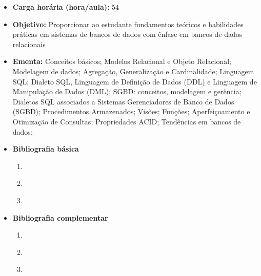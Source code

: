 \documentclass[11pt,fleqn]{book} %
\begin{document}
\begin{itemize}
	\item \textbf{Carga horária (hora/aula):} 54
	\item \textbf{Objetivo:} Proporcionar ao estudante fundamentos teóricos e habilidades práticas em sistemas de bancos de dados com ênfase em bancos de dados relacionais
	\item \textbf{Ementa:} 
	Conceitos básicos;
	Modelos Relacional e Objeto Relacional;
	Modelagem de dados; 
	Agregação, Generalização e Cardinalidade; 
	Linguagem SQL; 
	Dialeto SQL, Linguagem de Definição de Dados (DDL) e Linguagem de Manipulação de Dados (DML);
	SGBD: conceitos, modelagem e gerência;
	Dialetos SQL associados a Sistemas Gerenciadores de Banco de Dados (SGBD);
	Procedimentos Armazenados; 
	Visões; 
	Funções; 
	Aperfeiçoamento e Otimização de Consultas;
	Propriedades ACID;
	Tendências em bancos de dados;
	\item \textbf{Bibliografia básica}
	\begin{enumerate}
		\item~\cite{silberschatz2016}
		\item~\cite{date2004}
		\item~\cite{heuser2009}
	\end{enumerate}
	\item \textbf{Bibliografia complementar}
	\begin{enumerate}
		\item~\cite{sadalage2019}
		\item~\cite{casanova2005}
		\item~\cite{milani2008}
	\end{enumerate}	
\end{itemize}


\newpage
\end{document}
